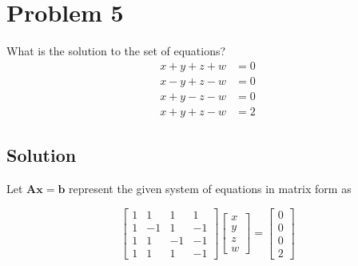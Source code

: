 \section*{Problem 5}

What is the solution to the set of equations?
\begin{align*}
    x + y + z + w & = 0 \\
    x - y + z - w & = 0 \\
    x + y - z - w & = 0 \\
    x + y + z - w & = 2
\end{align*}

\subsection*{Solution}

Let \( \mathbf{A}\mathbf{x} = \mathbf{b} \) represent the given system of equations in matrix form as

\begin{equation*}
    \begin{bmatrix}
        1 & 1  & 1  & 1  \\
        1 & -1 & 1  & -1 \\
        1 & 1  & -1 & -1 \\
        1 & 1  & 1  & -1
    \end{bmatrix}
    \begin{bmatrix}
        x \\
        y \\
        z \\
        w
    \end{bmatrix}
    =
    \begin{bmatrix}
        0 \\
        0 \\
        0 \\
        2
    \end{bmatrix}
\end{equation*}

\newenvironment{amatrix}[1]{%
    \left[\begin{array}{@{}*{#1}{c}|c@{}}}{%
        \end{array}\right]
}

